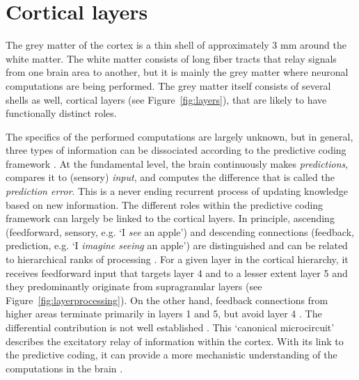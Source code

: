 \section*{Cortical layers}
The grey matter of the cortex is a thin shell of approximately 3 mm \cite{Zilles1990} around the white matter. The white matter consists of long fiber tracts that relay signals from one brain area to another, but it is mainly the grey matter where neuronal computations are being performed. The grey matter itself consists of several shells as well, cortical layers (see Figure~\ref{fig:layers}), that are likely to have functionally distinct roles.

The specifics of the performed computations are largely unknown, but in general, three types of information can be dissociated according to the predictive coding framework \cite{Friston2010}. At the fundamental level, the brain continuously makes \emph{predictions}, compares it to (sensory) \emph{input}, and computes the difference that is called the \emph{prediction error}. This is a never ending recurrent process of updating knowledge based on new information. The different roles within the predictive coding framework can largely be linked to the cortical layers. In principle, ascending (feedforward, sensory, e.g. `I \emph{see} an apple') and descending connections (feedback, prediction, e.g. `I \emph{imagine seeing} an apple') are distinguished \cite{Rockland1979} and can be related to hierarchical ranks of processing \cite{Barone2000}. For a given layer in the cortical hierarchy, it receives feedforward input that targets layer 4 and to a lesser extent layer 5 \cite{Constantinople2013} and they predominantly originate from supragranular layers (see Figure~\ref{fig:layerprocessing}). On the other hand, feedback connections from higher areas terminate primarily in layers 1 and 5, but avoid layer 4 \cite{Anderson2009}. The differential contribution is not well established \cite{Shipp2013}. This `canonical microcircuit' describes the excitatory relay of information within the cortex. With its link to the predictive coding, it can provide a more mechanistic understanding of the computations in the brain \cite{Shipp2016}.



